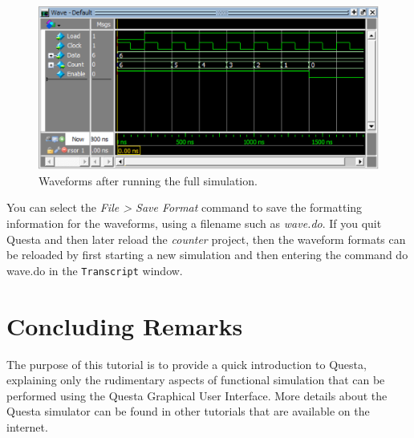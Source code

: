 \documentclass[11pt, twoside, pdftex]{article}
\newcommand{\commonPath}{../../../Common}
\begin{document}
\begin{figure}[H]
   \begin{center}
      \includegraphics[scale=.75]{figures/counter_1600ns.png}
       \caption{Waveforms after running the full simulation.} 
	 \label{fig:counter_1600ns}
	 \end{center}
\end{figure}

You can select the {\it File > Save Format} command to save the formatting information for the waveforms,
using a filename such as {\it wave.do}. If you quit Questa and then later reload the {\it counter} project,
then the waveform formats can be reloaded by first starting a new simulation and then entering the command 
{\sf do wave.do} in the \texttt{Transcript} window.

\section{Concluding Remarks}

The purpose of this tutorial is to provide a quick introduction to Questa, explaining only
the rudimentary aspects of functional simulation that can be performed using the Questa
Graphical User Interface. More details about the Questa simulator can be found in other 
tutorials that are available on the internet.



\end{document}
